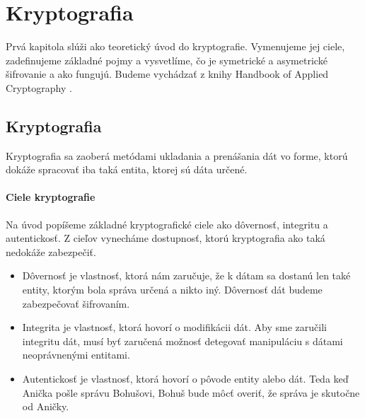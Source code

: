 \chapter{Kryptografia}

Prvá kapitola slúži ako teoretický úvod do kryptografie. Vymenujeme jej ciele, zadefinujeme základné pojmy a vysvetlíme, čo je symetrické a asymetrické šifrovanie a ako fungujú. Budeme vychádzať z knihy Handbook of Applied Cryptography \cite{HOAC}.

\section{Kryptografia}
	Kryptografia sa zaoberá metódami ukladania a prenášania dát vo forme, ktorú dokáže spracovať iba taká entita, ktorej sú dáta určené.
	\subsubsection{Ciele kryptografie}
	Na úvod popíšeme základné kryptografické ciele ako dôvernosť, integritu a autentickosť. Z cieľov vynecháme dostupnosť, ktorú kryptografia ako taká nedokáže zabezpečiť.
		\begin{itemize}
		\item Dôvernosť je vlastnosť, ktorá nám zaručuje, že k dátam sa dostanú len také entity, ktorým bola správa určená a nikto iný. Dôvernosť dát budeme zabezpečovať šifrovaním. 
		\item Integrita je vlastnosť, ktorá hovorí o modifikácii dát. Aby sme zaručili integritu dát, musí byť zaručená možnosť detegovať manipuláciu s dátami neoprávnenými entitami.
		\item Autentickosť je vlastnosť, ktorá hovorí o pôvode entity alebo dát. Teda keď Anička pošle správu Bohušovi, Bohuš bude môcť overiť, že správa je skutočne od Aničky. 
		\end{itemize}

